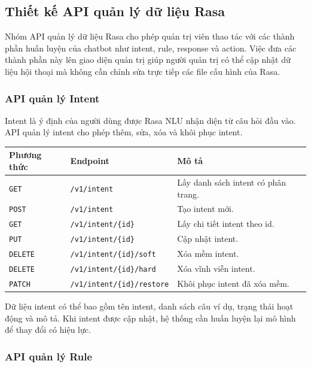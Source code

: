 \subsection{Thiết kế API quản lý dữ liệu Rasa}

Nhóm API quản lý dữ liệu Rasa cho phép quản trị viên thao tác với các thành phần huấn luyện của chatbot như intent, rule, response và action. Việc đưa các thành phần này lên giao diện quản trị giúp người quản trị có thể cập nhật dữ liệu hội thoại mà không cần chỉnh sửa trực tiếp các file cấu hình của Rasa.

\subsubsection{API quản lý Intent}

Intent là ý định của người dùng được Rasa NLU nhận diện từ câu hỏi đầu vào. API quản lý intent cho phép thêm, sửa, xóa và khôi phục intent.

\begin{longtable}{|p{3cm}|p{5cm}|p{7cm}|}
\hline
\textbf{Phương thức} & \textbf{Endpoint} & \textbf{Mô tả} \\
\hline
\texttt{GET} & \texttt{/v1/intent} & Lấy danh sách intent có phân trang. \\
\hline
\texttt{POST} & \texttt{/v1/intent} & Tạo intent mới. \\
\hline
\texttt{GET} & \texttt{/v1/intent/\{id\}} & Lấy chi tiết intent theo id. \\
\hline
\texttt{PUT} & \texttt{/v1/intent/\{id\}} & Cập nhật intent. \\
\hline
\texttt{DELETE} & \texttt{/v1/intent/\{id\}/soft} & Xóa mềm intent. \\
\hline
\texttt{DELETE} & \texttt{/v1/intent/\{id\}/hard} & Xóa vĩnh viễn intent. \\
\hline
\texttt{PATCH} & \texttt{/v1/intent/\{id\}/restore} & Khôi phục intent đã xóa mềm. \\
\hline
\end{longtable}

Dữ liệu intent có thể bao gồm tên intent, danh sách câu ví dụ, trạng thái hoạt động và mô tả. Khi intent được cập nhật, hệ thống cần huấn luyện lại mô hình để thay đổi có hiệu lực.

\subsubsection{API quản lý Rule}

